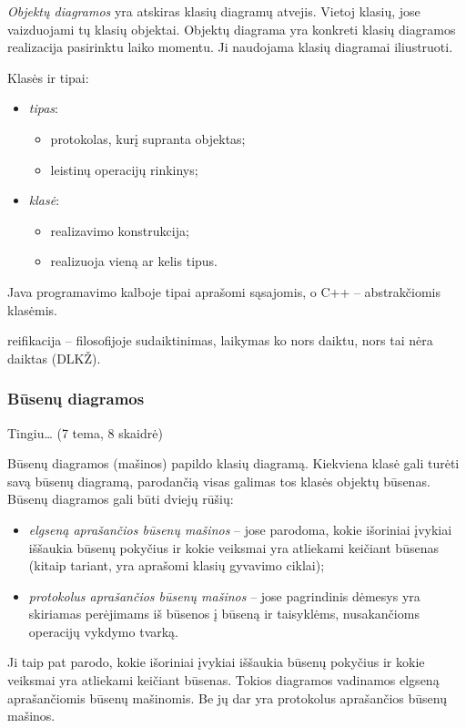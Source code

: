 \emph{Objektų diagramos} yra atskiras klasių diagramų atvejis. Vietoj
klasių, jose vaizduojami tų klasių objektai. Objektų diagrama yra konkreti
klasių diagramos realizacija pasirinktu laiko momentu. Ji naudojama
klasių diagramai iliustruoti.



Klasės ir tipai:
\begin{itemize}
  \item \emph{tipas}:
    \begin{itemize}
      \item protokolas, kurį supranta objektas;
      \item leistinų operacijų rinkinys;
    \end{itemize}
  \item \emph{klasė}:
    \begin{itemize}
      \item realizavimo konstrukcija;
      \item realizuoja vieną ar kelis tipus.
    \end{itemize}
\end{itemize}
Java programavimo kalboje tipai aprašomi sąsajomis, o C++ – abstrakčiomis
klasėmis.

reifikacija – filosofijoje sudaiktinimas, laikymas ko nors daiktu, nors
tai nėra daiktas (DLKŽ).


\subsubsection{Būsenų diagramos}

Tingiu… (7 tema, 8 skaidrė)

Būsenų diagramos (mašinos) papildo klasių diagramą. Kiekviena klasė gali
turėti savą būsenų diagramą, parodančią visas galimas tos klasės objektų
būsenas. Būsenų diagramos gali būti dviejų rūšių:
\begin{itemize}
  \item \emph{elgseną aprašančios būsenų mašinos} – jose parodoma, kokie
    išoriniai įvykiai iššaukia būsenų pokyčius ir kokie veiksmai yra
    atliekami keičiant būsenas (kitaip tariant, yra aprašomi klasių
    gyvavimo ciklai);
  \item \emph{protokolus aprašančios būsenų mašinos} – jose pagrindinis
    dėmesys yra skiriamas perėjimams iš būsenos į būseną ir taisyklėms,
    nusakančioms operacijų vykdymo tvarką.
\end{itemize}
Ji taip pat parodo, kokie išoriniai įvykiai iššaukia būsenų
pokyčius ir kokie veiksmai yra atliekami keičiant būsenas. Tokios
diagramos vadinamos elgseną aprašančiomis būsenų mašinomis. Be jų dar yra
protokolus aprašančios būsenų mašinos.

